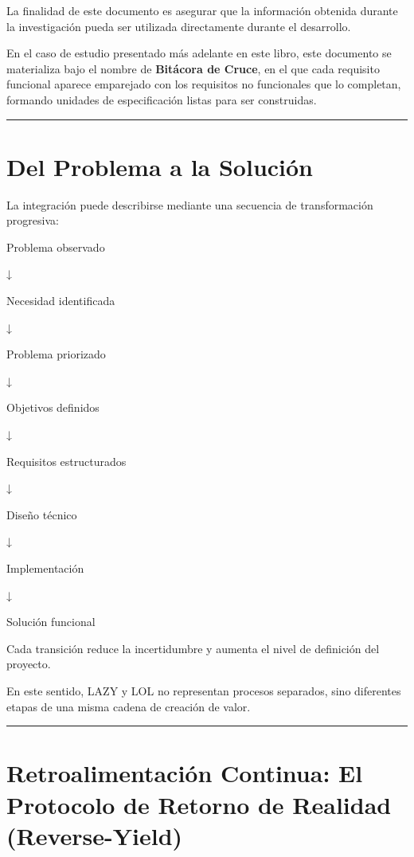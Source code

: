 \documentclass[14pt,a4paper,oneside]{extbook}
\begin{document}
La finalidad de este documento es asegurar que la información obtenida durante la investigación pueda ser utilizada directamente durante el desarrollo.

En el caso de estudio presentado más adelante en este libro, este documento se materializa bajo el nombre de \textbf{Bitácora de Cruce}, en el que cada requisito funcional aparece emparejado con los requisitos no funcionales que lo completan, formando unidades de especificación listas para ser construidas.

\par\vspace{1.5em}\noindent\hfill\rule{0.25\textwidth}{0.6pt}\hfill\par\vspace{1.5em}

\section{Del Problema a la Solución}

La integración puede describirse mediante una secuencia de transformación progresiva:

Problema observado

↓

Necesidad identificada

↓

Problema priorizado

↓

Objetivos definidos

↓

Requisitos estructurados

↓

Diseño técnico

↓

Implementación

↓

Solución funcional

Cada transición reduce la incertidumbre y aumenta el nivel de definición del proyecto.

En este sentido, LAZY y LOL no representan procesos separados, sino diferentes etapas de una misma cadena de creación de valor.

\par\vspace{1.5em}\noindent\hfill\rule{0.25\textwidth}{0.6pt}\hfill\par\vspace{1.5em}

\section{Retroalimentación Continua: El Protocolo de Retorno de Realidad (Reverse-Yield)}
\end{document}

